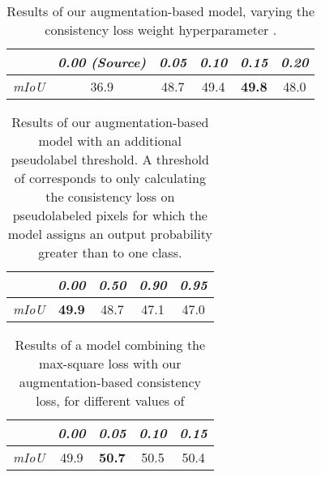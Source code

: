 \documentclass[final]{cvpr}
\begin{document}
\begin{table}[t]
  \def\arraystretch{1.4}
  \begin{center}
  \vspace{2mm}
  \begin{tabular}{lccccc} \hline
   & \textit{0.00 (Source)}   & \textit{0.05} & \textit{0.10} & \textit{0.15} & \textit{0.20} \\ \toprule 
  \textit{mIoU} & 36.9 & 48.7 & 49.4 & \textbf{49.8} & 48.0 \\ \bottomrule
  \end{tabular}
  \vspace{2mm}
  \caption{Results of our augmentation-based model, varying the consistency loss weight hyperparameter .}
\label{table:ablation}
  \end{center}
\end{table}



\begin{table}[t]
  \def\arraystretch{1.4}
  \begin{center}
  \vspace{2mm}
  \begin{tabular}{lcccc} \hline
   & \textit{0.00}   & \textit{0.50} & \textit{0.90} & \textit{0.95} \\ \toprule 
  \textit{mIoU} & \textbf{49.9} & 48.7 & 47.1 & 47.0 \\ \bottomrule
  \end{tabular}
  \vspace{2mm}
  \end{center}
  \caption{Results of our augmentation-based model with an additional pseudolabel threshold. A threshold of  corresponds to only calculating the consistency loss on pseudolabeled pixels for which the model assigns an output probability greater than  to one class.}
  \label{table:threshold}
\end{table}

\begin{table}[t]
  \def\arraystretch{1.4}
  \begin{center}
  \vspace{2mm}
  \begin{tabular}{lcccc} \hline
   & \textit{0.00}   & \textit{0.05} & \textit{0.10} & \textit{0.15} \\ \toprule \midrule 
  \textit{mIoU} & 49.9 & \textbf{50.7} & 50.5 & 50.4 \\ \bottomrule
  \end{tabular}
  \vspace{2mm}
  \caption{Results of a model combining the max-square loss \cite{maxsquare} with our augmentation-based consistency loss, for different values of }
\label{table:combining}
  \end{center}
\end{table}
\end{document}
